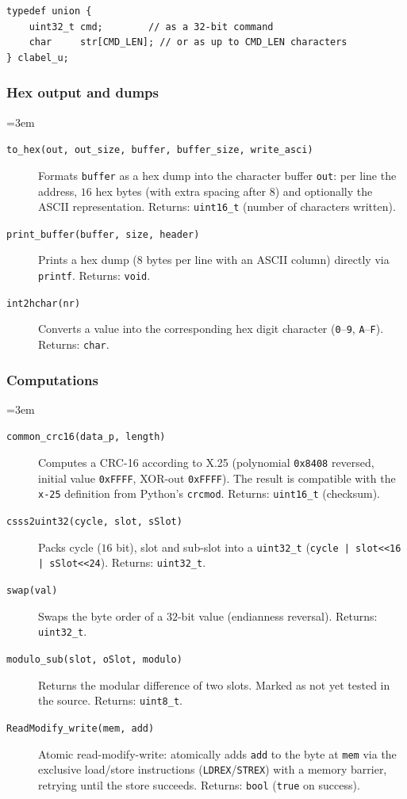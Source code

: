 \begin{listing}
\begin{verbatim}
typedef union {
    uint32_t cmd;        // as a 32-bit command
    char     str[CMD_LEN]; // or as up to CMD_LEN characters
} clabel_u;
\end{verbatim}
\caption{Label/command union \texttt{clabel\_u}}
\label{clabel_u}
\end{listing}

\subsubsection*{Hex output and dumps}
{\sloppy\emergencystretch=3em
\begin{description}
\item[\texttt{to\_hex(out, out\_size, buffer, buffer\_size, write\_asci)}]
  Formats \verb|buffer| as a hex dump into the character buffer \verb|out|:
  per line the address, $16$ hex bytes (with extra spacing after $8$) and
  optionally the ASCII representation. Returns: \verb|uint16_t| (number of
  characters written).
\item[\texttt{print\_buffer(buffer, size, header)}] Prints a hex dump
  ($8$ bytes per line with an ASCII column) directly via \verb|printf|.
  Returns: \verb|void|.
\item[\texttt{int2hchar(nr)}] Converts a value into the corresponding hex digit
  character (\texttt{0}--\texttt{9}, \texttt{A}--\texttt{F}). Returns:
  \verb|char|.
\end{description}
\par}

\subsubsection*{Computations}
{\sloppy\emergencystretch=3em
\begin{description}
\item[\texttt{common\_crc16(data\_p, length)}] Computes a CRC-16 according to
  X.25 (polynomial \verb|0x8408| reversed, initial value \verb|0xFFFF|,
  XOR-out \verb|0xFFFF|). The result is compatible with the \verb|x-25|
  definition from Python's \verb|crcmod|. Returns: \verb|uint16_t| (checksum).
\item[\texttt{csss2uint32(cycle, slot, sSlot)}] Packs cycle ($16$ bit), slot
  and sub-slot into a \verb|uint32_t| (\verb!cycle | slot<<16 | sSlot<<24!).
  Returns: \verb|uint32_t|.
\item[\texttt{swap(val)}] Swaps the byte order of a $32$-bit value (endianness
  reversal). Returns: \verb|uint32_t|.
\item[\texttt{modulo\_sub(slot, oSlot, modulo)}] Returns the modular
  difference of two slots. Marked as not yet tested in the source. Returns:
  \verb|uint8_t|.
\item[\texttt{ReadModify\_write(mem, add)}] Atomic read-modify-write:
  atomically adds \verb|add| to the byte at \verb|mem| via the exclusive
  load/store instructions (\verb|LDREX|/\verb|STREX|) with a memory barrier,
  retrying until the store succeeds. Returns: \verb|bool| (\verb|true| on
  success).
\end{description}
\par}

